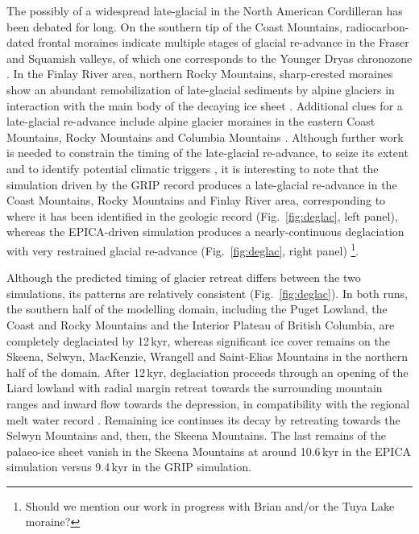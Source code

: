 \documentclass[tc, manuscript]{copernicus}
\begin{document}
The possibly of a widespread late-glacial in
the North American Cordilleran has been debated for long. On the southern tip
of the Coast Mountains, radiocarbon-dated frontal moraines indicate multiple
stages of glacial re-advance in the Fraser and Squamish valleys, of which
one corresponds to the Younger Dryas chronozone \citep{Clague.etal.1997,
Friele.Clague.2002, Friele.Clague.2002a, Kovanen.2002,
Kovanen.Easterbrook.2002}. In the Finlay River area, northern Rocky Mountains,
sharp-crested moraines show an abundant remobilization of late-glacial
sediments by alpine glaciers in interaction with the main body of the decaying
ice sheet \citep{Lakeman.etal.2008}. Additional clues for a late-glacial
re-advance include alpine glacier moraines in the eastern Coast Mountains,
Rocky Mountains and Columbia Mountains \citep{Menounos.etal.2008}. Although
further work is needed to constrain the timing of the late-glacial re-advance,
to seize its extent and to identify potential climatic triggers
\citep{Menounos.etal.2008}, it is interesting to note that the simulation
driven by the GRIP record produces a late-glacial re-advance in the Coast
Mountains, Rocky Mountains and Finlay River area, corresponding to where it
has been identified in the geologic record (Fig.~\ref{fig:deglac}, left panel),
whereas the EPICA-driven simulation produces a nearly-continuous deglaciation
with very restrained glacial re-advance (Fig.~\ref{fig:deglac}, right panel)%
\footnote{Should we mention our work in progress with Brian and/or the Tuya
    Lake moraine?}.

Although the predicted timing of glacier retreat differs between the two
simulations, its patterns are relatively consistent (Fig.~\ref{fig:deglac}). In
both runs, the southern half of the modelling domain, including the Puget
Lowland, the Coast and Rocky Mountains and the Interior Plateau of British
Columbia, are completely deglaciated by 12\,kyr, whereas significant ice cover
remains on the Skeena, Selwyn, MacKenzie, Wrangell and Saint-Elias Mountains
in the northern half of the domain. After 12\,kyr, deglaciation proceeds
through an opening of the Liard lowland with radial margin retreat towards the
surrounding mountain ranges and inward flow towards the depression, in
compatibility with the regional melt water record \citep{Margold.etal.2013}.
Remaining ice continues its decay by retreating towards the Selwyn Mountains
and, then, the Skeena Mountains. The last remains of the palaeo-ice sheet
vanish in the Skeena Mountains at around 10.6\,kyr in the EPICA simulation
versus 9.4\,kyr in the GRIP simulation.
\end{document}

